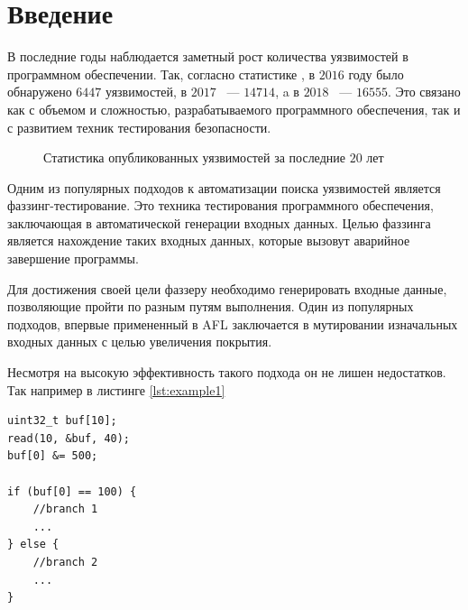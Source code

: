 \chapter*{Введение}


В последние годы наблюдается заметный рост количества уязвимостей в программном обеспечении. Так, согласно статистике \cite{CVEstats}, в $2016$ году было обнаружено $6447$ уязвимостей, в $2017$ ~---  $14714$, a в $2018$ ~--- $16555$. Это связано как с объемом и сложностью, разрабатываемого программного обеспечения, так и с развитием техник тестирования безопасности.

\begin{figure}[h]
    \caption{Статистика опубликованных уязвимостей за последние $20$ лет}
    \label{fig:image}
\end{figure}

Одним из популярных подходов к автоматизации поиска уязвимостей является фаззинг-тестирование. Это
техника тестирования программного обеспечения, заключающая в автоматической генерации входных данных. Целью фаззинга является нахождение таких входных данных, которые вызовут аварийное завершение программы.

Для достижения своей цели фаззеру необходимо генерировать входные данные, позволяющие пройти по разным путям выполнения. Один из популярных подходов, впервые примененный в AFL \cite{AFL} заключается в мутировании изначальных входных данных с целью увеличения покрытия.

Несмотря на высокую эффективность такого подхода он не лишен недостатков. Так например в листинге \ref{lst:example1}
\begin{lstlisting}[environoment=C_LANG, caption=example.c, captionpos=b, label={lst:example1}]
uint32_t buf[10];
read(10, &buf, 40);
buf[0] &= 500;

if (buf[0] == 100) {
    //branch 1
    ...
} else {
    //branch 2
    ...
}
\end{lstlisting}

